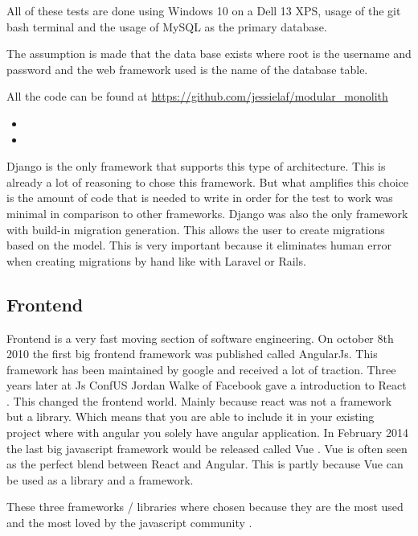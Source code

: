 All of these tests are done using Windows 10 on a Dell 13 XPS, usage of the git bash terminal and the usage of MySQL as the primary database.

The assumption is made that the data base exists where root is the username and password and the web framework used is the name of the database table.

All the code can be found at \url{https://github.com/jessielaf/modular_monolith}

\begin{itemize}
    \item {}
    \item {}
\end{itemize}

Django is the only framework that supports this type of architecture. This is already a lot of reasoning to chose this framework. But what amplifies this choice is the amount of code that is needed to write in order for the test to work was minimal in comparison to other frameworks. Django was also the only framework with build-in migration generation. This allows the user to create migrations based on the model. This is very important because it eliminates human error when creating migrations by hand like with Laravel or Rails.

\subsection{Frontend}

Frontend is a very fast moving section of software engineering. On october 8th 2010 \cite{angularJs} the first big frontend framework was published called AngularJs. This framework has been maintained by google and received a lot of traction. Three years later at Js ConfUS Jordan Walke of Facebook gave a introduction to React \cite{reactJs}. This changed the frontend world. Mainly because react was not a framework but a library. Which means that you are able to include it in your existing project where with angular you solely have angular application. In February 2014 the last big javascript framework would be released called Vue \cite{vueJs}. Vue is often seen as the perfect blend between React and Angular. This is partly because Vue can be used as a library and a framework.

These three frameworks / libraries where chosen because they are the most used and the most loved by the javascript community \cite{allFrontendFrameworks}.

